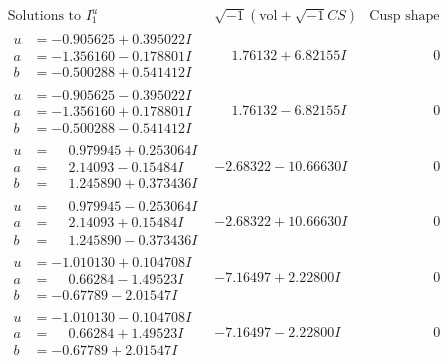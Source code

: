 \documentclass[1p]{elsarticle_modified}
\theoremstyle{definition}
\newcommand{\I}{\sqrt{-1}}
\begin{document}
$$\begin{array}{c|c|c}  
\text{Solutions to }I^u_{1}& \I (\text{vol} + \sqrt{-1}CS) & \text{Cusp shape}\\
 \hline 
\begin{aligned}
u &= -0.905625 + 0.395022 I \\
a &= -1.356160 - 0.178801 I \\
b &= -0.500288 + 0.541412 I\end{aligned}
 & \phantom{-}1.76132 + 6.82155 I & \phantom{-0.000000 } 0 \\ \hline\begin{aligned}
u &= -0.905625 - 0.395022 I \\
a &= -1.356160 + 0.178801 I \\
b &= -0.500288 - 0.541412 I\end{aligned}
 & \phantom{-}1.76132 - 6.82155 I & \phantom{-0.000000 } 0 \\ \hline\begin{aligned}
u &= \phantom{-}0.979945 + 0.253064 I \\
a &= \phantom{-}2.14093 - 0.15484 I \\
b &= \phantom{-}1.245890 + 0.373436 I\end{aligned}
 & -2.68322 - 10.66630 I & \phantom{-0.000000 } 0 \\ \hline\begin{aligned}
u &= \phantom{-}0.979945 - 0.253064 I \\
a &= \phantom{-}2.14093 + 0.15484 I \\
b &= \phantom{-}1.245890 - 0.373436 I\end{aligned}
 & -2.68322 + 10.66630 I & \phantom{-0.000000 } 0 \\ \hline\begin{aligned}
u &= -1.010130 + 0.104708 I \\
a &= \phantom{-}0.66284 - 1.49523 I \\
b &= -0.67789 - 2.01547 I\end{aligned}
 & -7.16497 + 2.22800 I & \phantom{-0.000000 } 0 \\ \hline\begin{aligned}
u &= -1.010130 - 0.104708 I \\
a &= \phantom{-}0.66284 + 1.49523 I \\
b &= -0.67789 + 2.01547 I\end{aligned}
 & -7.16497 - 2.22800 I & \phantom{-0.000000 } 0 \\ \hline\begin{aligned}

\end{aligned}
\end{array}$$
\end{document}
